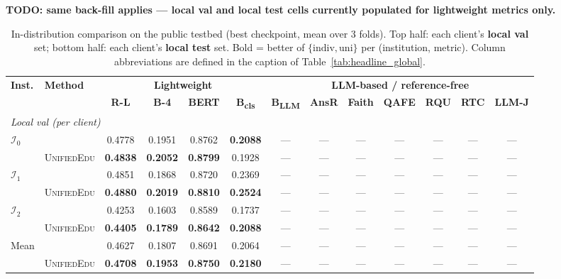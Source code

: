 \documentclass[11pt]{article}
\theoremstyle{plain}
\theoremstyle{definition}
\theoremstyle{remark}
\newcommand{\red}[1]{\textcolor{myred}{\textbf{#1}}}
\newcommand{\UniEdu}{\textsc{UnifiedEdu}}
\newcommand{\indiv}{\text{indiv}}
\newcommand{\uni}{\text{uni}}
\begin{document}
\red{TODO: same back-fill applies — local val and local test cells currently populated for lightweight metrics only.}
\begin{table}[t]
\centering
\footnotesize
\setlength{\tabcolsep}{2pt}
\caption{In-distribution comparison on the public
testbed (best checkpoint, mean over 3 folds). Top
half: each client's \textbf{local val} set; bottom
half: each client's \textbf{local test} set. Bold =
better of $\{\indiv, \uni\}$ per (institution,
metric). Column abbreviations are defined in the
caption of Table~\ref{tab:headline_global}.}
\label{tab:val_test}
\begin{tabular}{ll cccc ccccccc}
\toprule
\multirow{2}{*}{\textbf{Inst.}} &
\multirow{2}{*}{\textbf{Method}} &
\multicolumn{4}{c}{\textbf{Lightweight}} &
\multicolumn{7}{c}{\textbf{LLM-based / reference-free}} \\
\cmidrule(lr){3-6} \cmidrule(lr){7-13}
& &
\textbf{R-L} & \textbf{B-4} & \textbf{BERT} & \textbf{B\textsubscript{cls}} &
\textbf{B\textsubscript{LLM}} & \textbf{AnsR} & \textbf{Faith} & \textbf{QAFE} &
\textbf{RQU} & \textbf{RTC} & \textbf{LLM-J} \\
\midrule
\multicolumn{13}{l}{\textit{Local val (per client)}} \\
\midrule
\multirow{2}{*}{$\mathcal{I}_0$}
  & \indiv     & 0.4778 & 0.1951 & 0.8762 & \textbf{0.2088} & --- & --- & --- & --- & --- & --- & --- \\
  & \UniEdu{}  & \textbf{0.4838} & \textbf{0.2052} & \textbf{0.8799} & 0.1928 & --- & --- & --- & --- & --- & --- & --- \\
\multirow{2}{*}{$\mathcal{I}_1$}
  & \indiv     & 0.4851 & 0.1868 & 0.8720 & 0.2369 & --- & --- & --- & --- & --- & --- & --- \\
  & \UniEdu{}  & \textbf{0.4880} & \textbf{0.2019} & \textbf{0.8810} & \textbf{0.2524} & --- & --- & --- & --- & --- & --- & --- \\
\multirow{2}{*}{$\mathcal{I}_2$}
  & \indiv     & 0.4253 & 0.1603 & 0.8589 & 0.1737 & --- & --- & --- & --- & --- & --- & --- \\
  & \UniEdu{}  & \textbf{0.4405} & \textbf{0.1789} & \textbf{0.8642} & \textbf{0.2088} & --- & --- & --- & --- & --- & --- & --- \\
\multirow{2}{*}{Mean}
  & \indiv     & 0.4627 & 0.1807 & 0.8691 & 0.2064 & --- & --- & --- & --- & --- & --- & --- \\
  & \UniEdu{}  & \textbf{0.4708} & \textbf{0.1953} & \textbf{0.8750} & \textbf{0.2180} & --- & --- & --- & --- & --- & --- & --- \\

\end{tabular}
\end{table}
\end{document}
